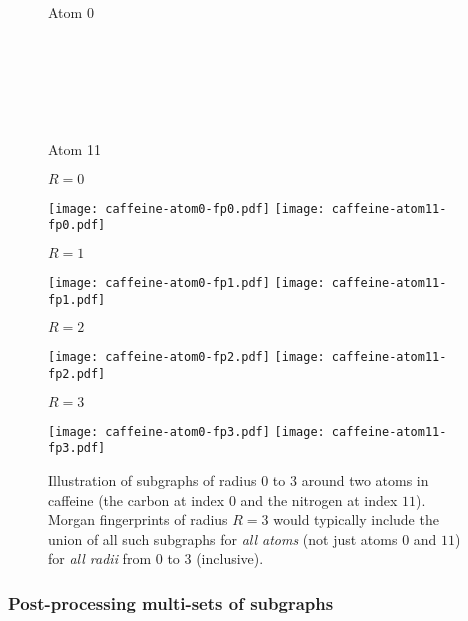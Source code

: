\begin{figure}
    \begin{minipage}[c]{0.06\textwidth}
        Atom 0%
        \\~\\~\\~\\~\\~\\~\\  %
        Atom 11
    \end{minipage}
    \begin{minipage}{0.22\textwidth}
        \centering
        $R=0$

        \texttt{[image: caffeine-atom0-fp0.pdf]}
        \texttt{[image: caffeine-atom11-fp0.pdf]}
    \end{minipage}
    \begin{minipage}{0.22\textwidth}
        \centering
        $R=1$

        \texttt{[image: caffeine-atom0-fp1.pdf]}
        \texttt{[image: caffeine-atom11-fp1.pdf]}
    \end{minipage}
    \begin{minipage}{0.22\textwidth}
        \centering
        $R=2$

        \texttt{[image: caffeine-atom0-fp2.pdf]}
        \texttt{[image: caffeine-atom11-fp2.pdf]}
    \end{minipage}
    \begin{minipage}{0.22\textwidth}
        \centering
        $R=3$

        \texttt{[image: caffeine-atom0-fp3.pdf]}
        \texttt{[image: caffeine-atom11-fp3.pdf]}
    \end{minipage}
    \caption[Illustration of subgraphs in Morgan fingerprints.]{
        Illustration of subgraphs of radius $0$ to $3$ around two atoms in caffeine
        (the carbon at index $0$ and the nitrogen at index $11$).
        Morgan fingerprints of radius $R=3$ would typically include the union of all such subgraphs
        for \emph{all atoms} (not just atoms $0$ and $11$) for \emph{all radii} from $0$ to $3$ (inclusive).
    }
    \label{fig:morgan-fp-example}
\end{figure}

\subsubsection{Post-processing multi-sets of subgraphs}

